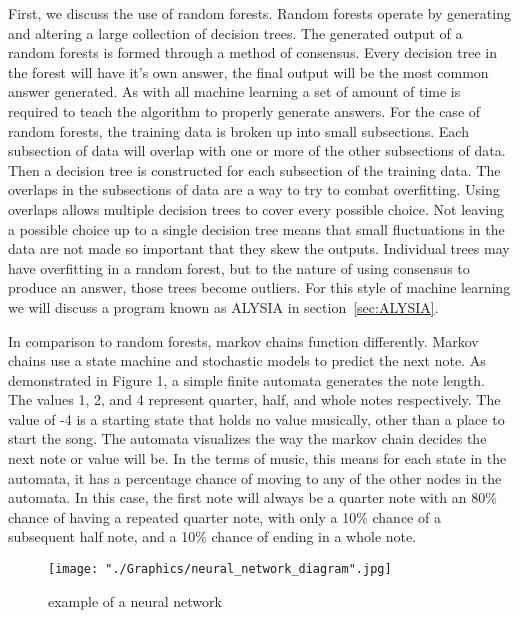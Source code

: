 \documentclass{sig-alternate}
\begin{document}
	First, we discuss the use of random forests. Random forests operate by generating and altering a large collection of decision trees. The generated output of a random forests is formed through a method of consensus. Every decision tree in the forest will have it's own answer, the final output will be the most common answer generated. As with all machine learning a set of amount of time is required to teach the algorithm to properly generate answers. For the case of random forests,  the training data is broken up into small subsections. Each subsection of data will overlap with one or more of the other subsections of data. Then a decision tree is constructed for each subsection of the training data. The overlaps in the subsections of data are a way to try to combat overfitting. Using overlaps allows multiple decision trees to cover every possible choice. Not leaving a possible choice up to a single decision tree means that small fluctuations in the data are not made so important that they skew the outputs. Individual trees may have overfitting in a random forest, but to the nature of using consensus to produce an answer, those trees become outliers. For this style of machine learning we will discuss a program known as ALYSIA in section~\ref{sec:ALYSIA}.

	In comparison to random forests, markov chains function differently. Markov chains use a state machine and stochastic models to predict the next note. As demonstrated in Figure 1, a simple finite automata generates the note length. The values 1, 2, and 4 represent quarter, half, and whole notes respectively. The value of -4 is a starting state that holds no value musically, other than a place to start the song. The automata visualizes the way the markov chain decides the next note or value will be. In the terms of music, this means for each state in the automata, it has a percentage chance of moving to any of the other nodes in the automata. In this case, the first note will always be a quarter note with an 80\% chance of having a repeated quarter note, with only a 10\% chance of a subsequent half note, and a 10\% chance of ending in a whole note.


\begin{figure}[H]
	\texttt{[image: "./Graphics/neural\_network\_diagram".jpg]}
	\caption{example of a neural network}
	\label{fig:neuralnetexample}
\end{figure}

	
\end{document}
